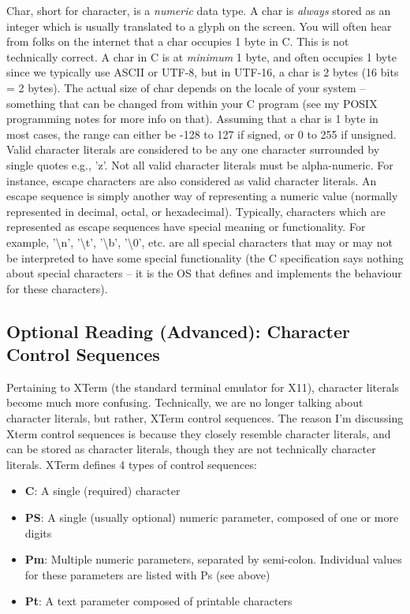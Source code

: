 \documentclass{article}
\begin{document}
Char, short for character, is a \textit{numeric} data type. A char is \textit{always} stored as an integer
which is usually translated to a glyph on the screen. You will often hear from folks on the internet that a
char occupies 1 byte in C. This is not technically correct. A char in C is at \textit{minimum} 1 byte, and
often occupies 1 byte since we typically use ASCII or UTF-8, but in UTF-16, a char is 2 bytes (16 bits = 2
bytes). The actual size of char depends on the locale of your system – something that can be changed from
within your C program (see my POSIX programming notes for more info on that). Assuming that a char is 1 byte
in most cases, the range can either be -128 to 127 if signed, or 0 to 255 if unsigned. Valid character
literals are considered to be any one character surrounded by single quotes e.g., 'z'. Not all valid character
literals must be alpha-numeric. For instance, escape characters are also considered as valid character
literals. An escape sequence is simply another way of representing a numeric value (normally represented in
decimal, octal, or hexadecimal). Typically, characters which are represented as escape sequences have special
meaning or functionality. For example, '\textbackslash{}n', '\textbackslash{}t', '\textbackslash{}b',
'\textbackslash{}0', etc. are all special characters that may or may not be interpreted to have some special
functionality (the C specification says nothing about special characters – it is the OS that defines and
implements the behaviour for these characters).

\subsection{Optional Reading (Advanced): Character Control Sequences}

Pertaining to XTerm (the standard terminal emulator for X11), character literals become much more confusing.
Technically, we are no longer talking about character literals, but rather, XTerm control sequences. The
reason I’m discussing Xterm control sequences is because they closely resemble character literals, and can be
stored as character literals, though they are not technically character literals. XTerm defines 4 types of
control sequences:

\begin{itemize}

\item{%
    \textbf{C}:  A single (required) character
}

\item{%
    \textbf{PS}: A single (usually optional) numeric parameter, composed of one or more digits
}

\item{%
    \textbf{Pm}: Multiple numeric parameters, separated by semi-colon. Individual values for these parameters
    are listed with Ps (see above)
}

\item{%
    \textbf{Pt}: A text parameter composed of printable characters
}

\end{itemize}
\end{document}
